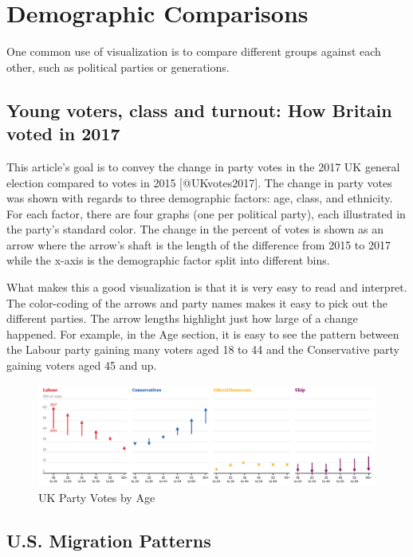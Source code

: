 \documentclass[]{book}
\theoremstyle{definition}
\theoremstyle{definition}
\theoremstyle{definition}
\theoremstyle{remark}
\begin{document}
\section{Demographic Comparisons}\label{demographic-comparisons}

One common use of visualization is to compare different groups against
each other, such as political parties or generations.

\subsection{Young voters, class and turnout: How Britain voted in
2017}\label{young-voters-class-and-turnout-how-britain-voted-in-2017}

This article's goal is to convey the change in party votes in the 2017
UK general election compared to votes in 2015 {[}@UKvotes2017{]}. The
change in party votes was shown with regards to three demographic
factors: age, class, and ethnicity. For each factor, there are four
graphs (one per political party), each illustrated in the party's
standard color. The change in the percent of votes is shown as an arrow
where the arrow's shaft is the length of the difference from 2015 to
2017 while the x-axis is the demographic factor split into different
bins.

What makes this a good visualization is that it is very easy to read and
interpret. The color-coding of the arrows and party names makes it easy
to pick out the different parties. The arrow lengths highlight just how
large of a change happened. For example, in the Age section, it is easy
to see the pattern between the Labour party gaining many voters aged 18
to 44 and the Conservative party gaining voters aged 45 and up.

\begin{figure}
\centering
\includegraphics{images/Party_Votes_by_Age.png}
\caption{UK Party Votes by Age}
\end{figure}

\subsection{U.S. Migration Patterns}\label{u.s.-migration-patterns}
\end{document}
